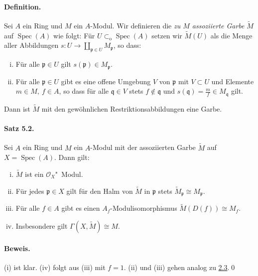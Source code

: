 \paragraph{Definition.} Sei $A$ ein Ring und $M$ ein $A$-Modul. Wir definieren die \textit{zu $M$ assoziierte Garbe} $\widetilde{M}$ auf $\operatorname{Spec}(A)$ wie folgt: Für $U\subset_\text{o}\operatorname{Spec}(A)$ setzen wir $\widetilde{M}(U)$ als die Menge aller Abbildungen $s:U\to\coprod_{\mathfrak{p}\in U}M_\mathfrak{p}$, so dass:
\begin{enumerate}[(i)]
\item Für alle $\mathfrak{p}\in U$ gilt $s(\mathfrak{p})\in M_\mathfrak{p}$.
\item Für alle $\mathfrak{p}\in U$ gibt es eine offene Umgebung $V$ von $\mathfrak{p}$ mit $V\subset U$ und Elemente $m\in M,\ f\in A$, so dass für alle $\mathfrak{q}\in V$ stets $f\not\in\mathfrak{q}$ und $s(\mathfrak{q})=\frac{m}{f}\in M_\mathfrak{q}$ gilt.
\end{enumerate}
Dann ist $\widetilde{M}$ mit den gewöhnlichen Restriktionsabbildungen eine Garbe.

\paragraph{Satz 5.2.}\label{5.2} Sei $A$ ein Ring und $M$ ein $A$-Modul mit der assoziierten Garbe $\widetilde{M}$ auf $X=\operatorname{Spec}(A)$. Dann gilt:\begin{enumerate}[(i)]
\item $\widetilde{M}$ ist ein $\mathcal{O}_X$"~Modul.
\item Für jedes $\mathfrak{p}\in X$ gilt für den Halm von $\widetilde{M}$ in $\mathfrak{p}$ stets $\widetilde{M}_\mathfrak{p}\cong M_\mathfrak{p}$.
\item Für alle $f\in A$ gibt es einen $A_f$-Modulisomorphismus $\widetilde{M}(D(f))\cong M_f$.
\item Insbesondere gilt $\Gamma(X,\widetilde{M})\cong M$.
\end{enumerate}

\paragraph{Beweis.} (i) ist klar. (iv) folgt aus (iii) mit $f=1$. (ii) und (iii) gehen analog zu \hyperref[2.3]{2.3}.\qed

